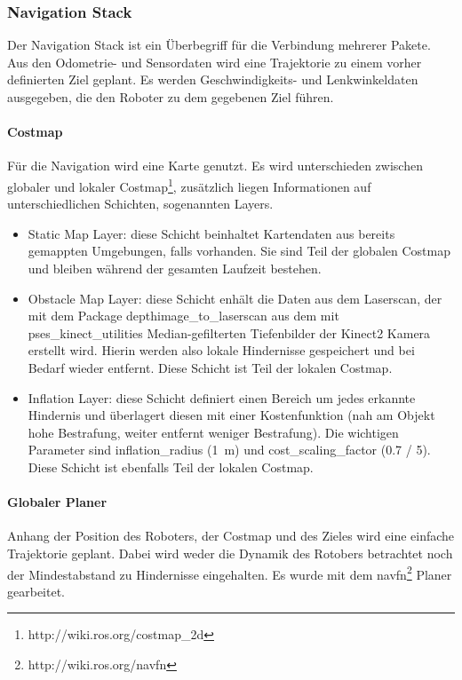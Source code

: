 \subsubsection{Navigation Stack}
\label{subsubsec:02navigatinStack}
Der Navigation Stack ist ein \"Uberbegriff f\"ur die Verbindung mehrerer Pakete. Aus den Odometrie- und Sensordaten wird eine Trajektorie zu einem vorher definierten Ziel geplant. Es werden Geschwindigkeits- und Lenkwinkeldaten ausgegeben, die den Roboter zu dem gegebenen Ziel f\"uhren.
\paragraph{Costmap}
F\"ur die Navigation wird eine Karte genutzt. Es wird unterschieden zwischen globaler und lokaler Costmap\footnote{http://wiki.ros.org/costmap\_2d}, zus\"atzlich liegen Informationen auf unterschiedlichen Schichten, sogenannten Layers.
\begin{itemize}
	\item Static Map Layer: diese Schicht beinhaltet Kartendaten aus bereits gemappten Umgebungen, falls vorhanden. Sie sind Teil der globalen Costmap und bleiben w\"ahrend der gesamten Laufzeit bestehen.
	\item Obstacle Map Layer: diese Schicht enh\"alt die Daten aus dem Laserscan, der mit dem Package depthimage\_to\_laserscan aus dem mit pses\_kinect\_utilities Median-gefilterten Tiefenbilder der Kinect2 Kamera erstellt wird. Hierin werden also lokale Hindernisse gespeichert und bei Bedarf wieder entfernt. Diese Schicht ist Teil der lokalen Costmap.
	\item Inflation Layer: diese Schicht definiert einen Bereich um jedes erkannte Hindernis und \"uberlagert diesen mit einer Kostenfunktion (nah am Objekt hohe Bestrafung, weiter entfernt weniger Bestrafung). Die wichtigen Parameter sind inflation\_radius (\SI{1}{\meter}) und cost\_scaling\_factor (0.7 / 5). Diese Schicht ist ebenfalls Teil der lokalen Costmap. 
\end{itemize}

\paragraph{Globaler Planer} 
Anhang der Position des Roboters, der Costmap und des Zieles wird eine einfache Trajektorie geplant. Dabei wird weder die Dynamik des Rotobers betrachtet noch der Mindestabstand zu Hindernisse eingehalten. Es wurde mit dem navfn\footnote{http://wiki.ros.org/navfn} Planer gearbeitet.

